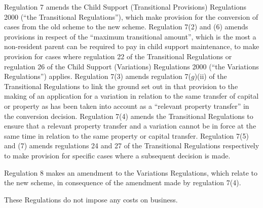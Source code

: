 \documentclass[12pt,a4paper]{article}
\begin{document}
Regulation 7 amends the Child Support (Transitional Provisions) Regulations 2000 (“the Transitional Regulations”), which make provision for the conversion of cases from the old scheme to the new scheme. Regulation 7(2) and (6) amends provisions in respect of the “maximum transitional amount”, which is the most a non-resident parent can be required to pay in child support maintenance, to make provision for cases where regulation 22 of the Transitional Regulations or regulation 26 of the Child Support (Variations) Regulations 2000 (“the Variations Regulations”) applies. Regulation 7(3) amends regulation 7($g$)(ii)  of the Transitional Regulations to link the ground set out in that provision to the making of an application for a variation in relation to the same transfer of capital or property as has been taken into account as a “relevant property transfer” in the conversion decision. Regulation 7(4) amends the Transitional Regulations to ensure that a relevant property transfer and a variation cannot be in force at the same time in relation to the same property or capital transfer. Regulation 7(5) and (7) amends regulations 24 and 27 of the Transitional Regulations respectively to make provision for specific cases where a subsequent decision is made.

Regulation 8 makes an amendment to the Variations Regulations, which relate to the new scheme, in consequence of the amendment made by regulation 7(4).

These Regulations do not impose any costs on business. 
\end{document}
